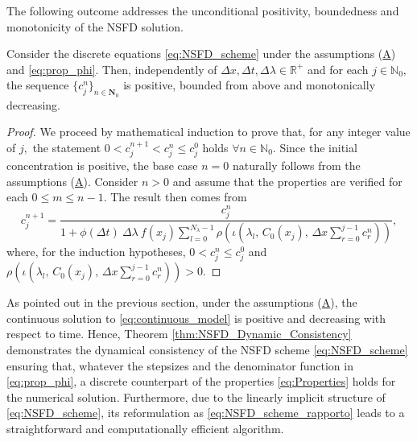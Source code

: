 \documentclass[a4paper, UKenglish, numberwithinsect, thm-restate]{tgdk-v2021}
\begin{document}
The following outcome addresses the unconditional positivity, boundedness and monotonicity of the NSFD solution.
\begin{theorem}\label{thm:NSFD_Dynamic_Consistency}
    Consider the discrete equations \eqref{eq:NSFD_scheme} under the assumptions (\hyperref[ass:1]{A}) and \eqref{eq:prop_phi}. Then, independently of $\Delta x, \Delta t, \Delta \lambda\in \mathbb{R}^+$ and for each $j\in \mathbb{N}_0,$ the  sequence $\{ c_j^n \}_{n\in \mathbf{N}_0}$ is positive, bounded from above and monotonically decreasing.
\end{theorem}
\begin{proof}
    We proceed by mathematical induction to prove that, for any integer value of $j,$ the statement $0<c_j^{n+1}<c_j^n\leq  c_j^0$ holds $\forall n\in \mathbb{N}_0.$ Since the initial concentration is positive, the base case $n=0$ naturally follows from the assumptions (\hyperref[ass:1]{A}). Consider $n>0$ and assume that the properties are verified for each $0\leq m \leq n-1.$ The result then comes from %
    \begin{equation}\label{eq:NSFD_scheme_rapporto}
        c_j^{n+1}=\dfrac{c_j^n}{ 1+ \phi(\Delta t) \ \Delta \lambda \ f(x_j) \sum_{l=0}^{N_\lambda-1}\rho\left(\iota\left(\lambda_l,\, C_0(x_j) ,\, \Delta x \sum_{r=0}^{j-1}c_r^n \right)\right)},
    \end{equation}
    where, for the induction hypotheses, $0<c_j^{n}\leq c_j^{0}$ and $\rho\left(\iota\left(\lambda_l,\, C_0(x_j) ,\, \Delta x \sum_{r=0}^{j-1}c_r^n \right)\right)>0.$ 
\end{proof}
As pointed out in the previous section, under the assumptions (\hyperref[ass:1]{A}), the continuous solution to \eqref{eq:continuous_model} is positive and decreasing with respect to time. Hence, Theorem \ref{thm:NSFD_Dynamic_Consistency} demonstrates the dynamical consistency \cite{Mickens_Dynamic_Consistency} of the NSFD scheme \eqref{eq:NSFD_scheme} ensuring that, whatever the stepsizes and the denominator function in \eqref{eq:prop_phi}, a discrete counterpart of the properties \eqref{eq:Properties} holds for the numerical solution. Furthermore, due to the linearly implicit structure of \eqref{eq:NSFD_scheme}, its reformulation as \eqref{eq:NSFD_scheme_rapporto} leads to a straightforward and computationally efficient algorithm.
\end{document}
